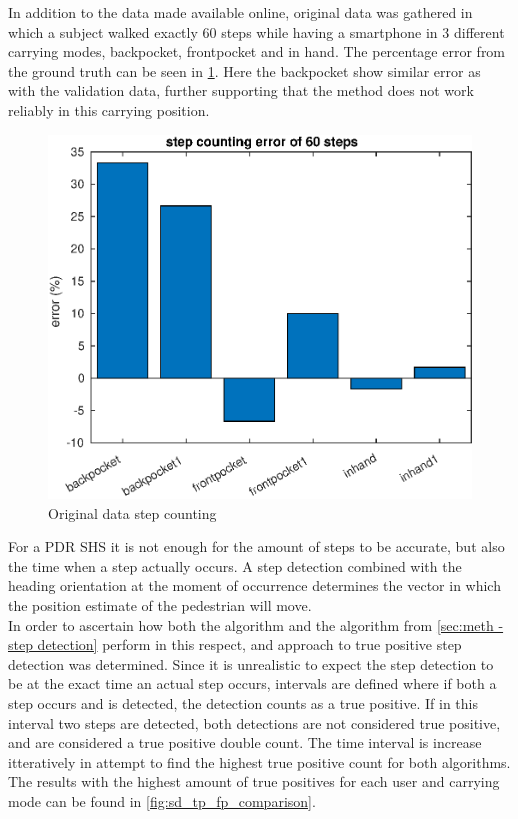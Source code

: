In addition to the data made available online, original data was gathered in which a subject walked exactly 60 steps while having a smartphone in 3 different carrying modes, backpocket, frontpocket and in hand. The percentage error from the ground truth can be seen in \cref{fig:202009291013step_counting_error_of_60_steps}. Here the backpocket show similar error as with the validation data, further supporting that the method does not work reliably in this carrying position.
\begin{figure}[H]
	\centering
	\includegraphics[width=0.55\linewidth]{images/20200929_1013_step_counting_error_of_60_steps}
	\caption{Original data step counting}
	\label{fig:202009291013step_counting_error_of_60_steps}
\end{figure}

For a PDR SHS it is not enough for the amount of steps to be accurate, but also the time when a step actually occurs. A step detection combined with the heading orientation at the moment of occurrence determines the vector in which the position estimate of the pedestrian will move. \\
In order to ascertain how both the \citet{Salvi2018} algorithm and the algorithm from \cref{sec:meth - step detection} perform in this respect, and approach to true positive step detection was determined. Since it is unrealistic to expect the step detection to be at the exact time an actual step occurs, intervals are defined where if both a step occurs and is detected, the detection counts as a true positive. If in this interval two steps are detected, both detections are not considered true positive, and are considered a true positive double count. The time interval is increase itteratively in attempt to find the highest true positive count for both algorithms. The results with the highest amount of true positives for each user and carrying mode can be found in \cref{fig:sd_tp_fp_comparison}. 


